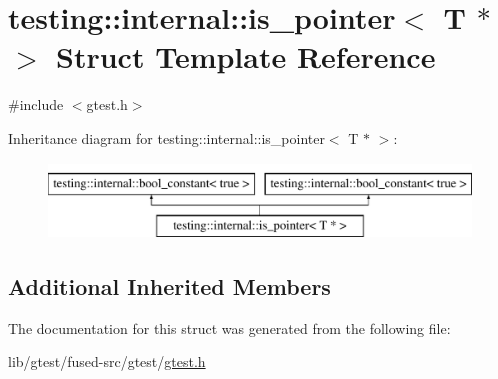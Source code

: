 \hypertarget{structtesting_1_1internal_1_1is__pointer_3_01_t_01_5_01_4}{\section{testing\-:\-:internal\-:\-:is\-\_\-pointer$<$ T $\ast$ $>$ Struct Template Reference}
\label{structtesting_1_1internal_1_1is__pointer_3_01_t_01_5_01_4}
}


{\ttfamily \#include $<$gtest.\-h$>$}

Inheritance diagram for testing\-:\-:internal\-:\-:is\-\_\-pointer$<$ T $\ast$ $>$\-:\begin{figure}[H]
\begin{center}
\leavevmode
\includegraphics[height=2.000000cm]{structtesting_1_1internal_1_1is__pointer_3_01_t_01_5_01_4}
\end{center}
\end{figure}
\subsection*{Additional Inherited Members}


The documentation for this struct was generated from the following file\-:\begin{DoxyCompactItemize}
\item 
lib/gtest/fused-\/src/gtest/\hyperlink{fused-src_2gtest_2gtest_8h}{gtest.\-h}\end{DoxyCompactItemize}
